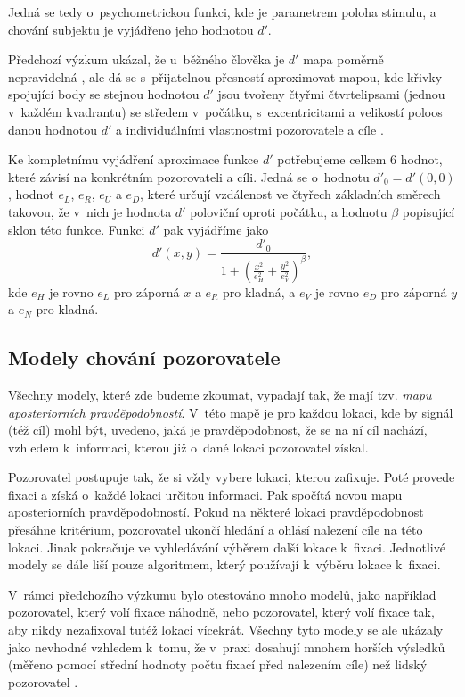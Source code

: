 Jedná se tedy o~psychometrickou funkci, kde je parametrem poloha stimulu, a chování subjektu je vyjádřeno jeho hodnotou
$d'$.

Předchozí výzkum ukázal, že u~běžného člověka je $d'$ mapa poměrně
nepravidelná \citep{Najemnik08}, ale dá se s~přijatelnou přesností aproximovat mapou, kde křivky
spojující body se stejnou hodnotou $d'$ jsou tvořeny čtyřmi čtvrt\-elipsami
(jednou v~každém kvadrantu) se středem v~počátku,
s~excentricitami a velikostí poloos danou hodnotou $d'$ a individuálními
vlastnostmi pozorovatele a cíle \citep{Ellipse}. 

Ke kompletnímu vyjádření aproximace funkce $d'$ potřebujeme celkem 6 hodnot,
které závisí na konkrétním pozorovateli a cíli. Jedná se o~hodnotu $d'_0 =
d'(0,0)$, hodnot $e_L$, $e_R$, $e_U$ a $e_D$, které určují vzdálenost ve čtyřech
základních směrech takovou, že v~nich je hodnota $d'$ poloviční oproti počátku,
a hodnotu $\beta$ popisující sklon této funkce. Funkci $d'$ pak vyjádříme jako
$$ d'(x,y) = \frac{d'_0}{1+\left(\frac{x^2}{e_H^2}+\frac{y^2}{e_V^2}
\right)^\beta}, $$ kde $e_H$ je rovno $e_L$ pro záporná $x$ a $e_R$ pro kladná,
a $e_V$ je rovno $e_D$ pro záporná $y$ a $e_N$ pro kladná.


\subsection{Modely chování pozorovatele}

Všechny modely, které zde budeme zkoumat, vypadají tak, že mají tzv. {\it mapu
aposteriorních pravděpodobností}. V~této mapě je pro každou lokaci, kde by
signál (též cíl) mohl být, uvedeno, jaká je pravděpodobnost, že se na ní cíl
nachází, vzhledem k~informaci, kterou již o~dané lokaci pozorovatel získal. 

Pozorovatel postupuje tak, že si vždy vybere lokaci, kterou zafixuje. Poté
provede fixaci a získá o~každé lokaci určitou informaci. Pak spočítá novou mapu
aposteriorních pravděpodobností. Pokud na některé lokaci pravděpodobnost přesáhne kritérium, pozorovatel
ukončí hledání a ohlásí nalezení cíle na této lokaci. Jinak pokračuje ve vyhledávání výběrem další lokace k~fixaci.
Jednotlivé modely se dále liší pouze algoritmem, který používají k~výběru lokace k~fixaci.


V~rámci předchozího výzkumu bylo otestováno mnoho modelů, jako například
pozorovatel, který volí fixace náhodně, nebo pozorovatel, který volí fixace 
tak, aby nikdy nezafixoval tutéž lokaci vícekrát. Všechny tyto modely se ale ukázaly jako
nevhodné vzhledem k~tomu, že v~praxi dosahují mnohem horších výsledků (měřeno
pomocí střední hodnoty počtu fixací před nalezením cíle) než lidský
pozorovatel \citep{Najemnik05}.

